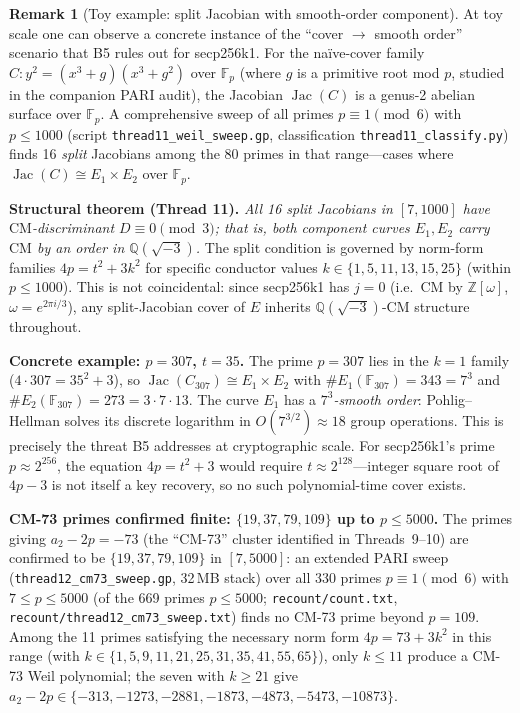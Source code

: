 \documentclass[11pt,a4paper]{article}
\theoremstyle{definition}
\newtheorem{remark}[theorem]{Remark}
\newcommand{\FF}{\mathbb{F}}
\newcommand{\ZZ}{\mathbb{Z}}
\newcommand{\QQ}{\mathbb{Q}}
\newcommand{\Jac}{\operatorname{Jac}}
\newcommand{\CM}{\mathrm{CM}}
\begin{document}
\begin{remark}[Toy example: split Jacobian with smooth-order component]
\label{rem:split-toy}
At toy scale one can observe a concrete instance of the ``cover $\to$ smooth order''
scenario that B5 rules out for secp256k1.  For the na\"ive-cover family
$C\colon y^2 = (x^3 + g)(x^3 + g^2)$ over $\FF_p$ (where $g$ is a primitive root
mod $p$, studied in the companion PARI audit), the Jacobian $\Jac(C)$ is a genus-2
abelian surface over $\FF_p$.  A comprehensive sweep of all primes $p \equiv 1
\pmod{6}$ with $p \le 1000$ (script \texttt{thread11\_weil\_sweep.gp},
classification \texttt{thread11\_classify.py}) finds 16 \emph{split} Jacobians
among the 80 primes in that range---cases where $\Jac(C) \cong E_1 \times E_2$
over $\FF_p$.

\medskip
\noindent\textbf{Structural theorem (Thread 11).}
\emph{All 16 split Jacobians in $[7, 1000]$ have $\CM$-discriminant $D \equiv 0
\pmod{3}$; that is, both component curves $E_1, E_2$ carry $\CM$ by an order in
$\QQ(\sqrt{-3})$.}
The split condition is governed by norm-form families $4p = t^2 + 3k^2$ for
specific conductor values $k \in \{1, 5, 11, 13, 15, 25\}$ (within $p \le 1000$).
This is not coincidental: since secp256k1 has $j = 0$ (i.e.\ $\CM$ by $\ZZ[\omega]$,
$\omega = e^{2\pi i/3}$), any split-Jacobian cover of $E$ inherits $\QQ(\sqrt{-3})$-$\CM$
structure throughout.

\medskip
\noindent\textbf{Concrete example: $p = 307$, $t = 35$.}
The prime $p = 307$ lies in the $k = 1$ family ($4 \cdot 307 = 35^2 + 3$), so
$\Jac(C_{307}) \cong E_1 \times E_2$ with $\#E_1(\FF_{307}) = 343 = 7^3$ and
$\#E_2(\FF_{307}) = 273 = 3 \cdot 7 \cdot 13$.  The curve $E_1$ has a \emph{$7^3$-smooth
order}: Pohlig--Hellman solves its discrete logarithm in
$O(7^{3/2}) \approx 18$ group operations.  This is precisely the threat B5 addresses
at cryptographic scale.  For secp256k1's prime $p \approx 2^{256}$, the equation
$4p = t^2 + 3$ would require $t \approx 2^{128}$---integer square root of $4p - 3$
is not itself a key recovery, so no such polynomial-time cover exists.

\medskip
\noindent\textbf{CM-73 primes confirmed finite: $\{19, 37, 79, 109\}$ up to $p \le 5000$.}
The primes giving $a_2 - 2p = -73$ (the ``CM-73'' cluster identified in
Threads~9--10) are confirmed to be $\{19, 37, 79, 109\}$ in $[7, 5000]$:
an extended PARI sweep (\texttt{thread12\_cm73\_sweep.gp}, 32\,MB stack) over
all 330 primes $p \equiv 1 \pmod{6}$ with $7 \le p \le 5000$ (of the 669 primes
$p \le 5000$; \texttt{recount/count.txt},
\texttt{recount/thread12\_cm73\_sweep.txt}) finds no CM-73 prime
beyond $p = 109$.  Among the 11 primes satisfying the necessary norm form
$4p = 73 + 3k^2$ in this range (with $k \in \{1,5,9,11,21,25,31,35,41,55,65\}$),
only $k \le 11$ produce a CM-73 Weil polynomial; the seven with $k \ge 21$
give $a_2 - 2p \in \{-313, -1273, -2881, -1873, -4873, -5473, -10873\}$.


\end{remark}
\end{document}
